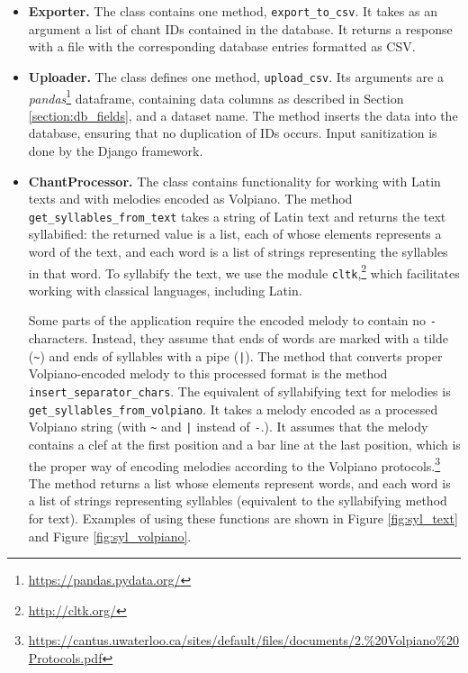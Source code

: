 \begin{itemize}

\item\textbf{Exporter.} The class contains one method, \verb|export_to_csv|. It takes as an argument a list of chant IDs contained in the database. It returns
a response with a file with the corresponding database entries formatted as CSV.

\item\textbf{Uploader.} The class defines one method, \verb|upload_csv|. Its arguments are a \emph{pandas}\footnote{\url{https://pandas.pydata.org/}} dataframe, containing
data columns as described in Section \ref{section:db_fields}, and a dataset name. The method inserts the data into the database, ensuring that no duplication 
of IDs occurs. Input sanitization is done by the Django framework.

\item\textbf{ChantProcessor.} The class contains functionality for working with Latin texts and with melodies encoded as Volpiano. The method \verb|get_syllables_from_text|
takes a string of Latin text and returns the text syllabified: the returned value is a list, each of whose elements represents a word of the text, and each word
is a list of strings representing the syllables in that word. To syllabify the text, we use the module \verb|cltk|,\footnote{\url{http://cltk.org/}} which facilitates
working with classical languages, including Latin.

Some parts of the application require the encoded melody to contain no \verb|-| characters. Instead, they assume that ends of words are marked with a tilde (\verb|~|) and ends of
syllables with a pipe (\verb=|=). The method that converts proper Volpiano-encoded melody to this processed format is the method \verb|insert_separator_chars|.
The equivalent of syllabifying text for melodies is \verb|get_syllables_from_volpiano|. It takes a melody encoded as a processed Volpiano string (with \verb|~| and \verb=|=
instead of \verb|-|.). It assumes that the
melody contains a clef at the first position and a bar line at the last position, which is the proper way of encoding melodies according to the Volpiano
protocols.\footnote{\url{https://cantus.uwaterloo.ca/sites/default/files/documents/2.\%20Volpiano\%20Protocols.pdf}} The method returns a list whose elements represent words,
and each word is a list of strings representing syllables (equivalent to the syllabifying method for text). Examples of using these functions are shown in Figure \ref{fig:syl_text}
and Figure \ref{fig:syl_volpiano}.


\end{itemize}
